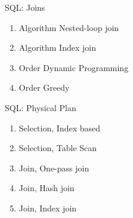 \begin{frame}{SQL: Joins}
    \begin{enumerate}
        \item Algorithm Nested-loop join
        \item Algorithm Index join
        \item Order Dynamic Programming
        \item Order Greedy
    \end{enumerate}
\end{frame}

\begin{frame}{SQL: Physical Plan}
    \begin{enumerate}
        \item Selection, Index based
        \item Selection, Table Scan
        \item Join, One-pass join
        \item Join, Hash join
        \item Join, Index join
    \end{enumerate}
\end{frame}



